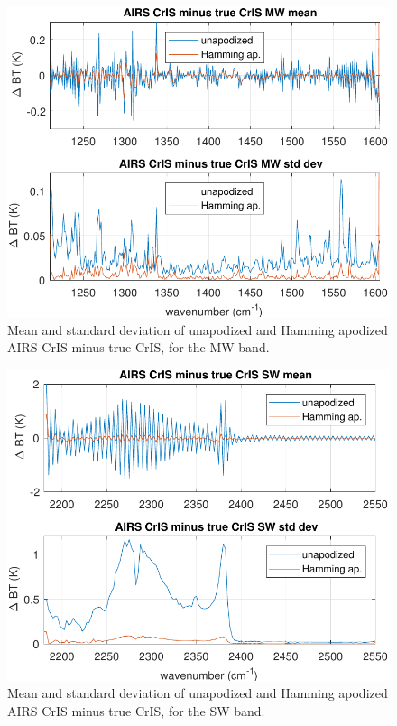\documentclass[journal]{IEEEtran}
\begin{document}
\begin{figure} %
  \centering
  \includegraphics[width=\linewidth]{figures/a2cris_diff_MW.pdf}
  \caption{Mean and standard deviation of unapodized and Hamming
    apodized AIRS CrIS minus true CrIS, for the MW band.}
  \label{diffMW}
\end{figure}

\begin{figure} %
  \centering
  \includegraphics[width=\linewidth]{figures/a2cris_diff_SW.pdf}
  \caption{Mean and standard deviation of unapodized and Hamming
    apodized AIRS CrIS minus true CrIS, for the SW band.}
  \label{diffSW}
\end{figure}
\end{document}
